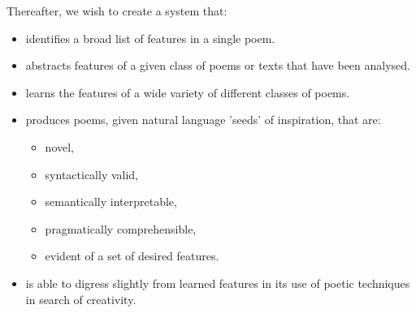 Thereafter, we wish to create a system that:
\begin{itemize}
\item{identifies a broad list of features in a single poem.} 
\item{abstracts features of a given class of poems or texts that have been analysed.}
\item{learns the features of a wide variety of different classes of poems.}
\item{produces poems, given natural language 'seeds' of inspiration, that are:}
	\begin{itemize}
	\setlength{\itemsep}{0pt}
	\item{novel,}
	\item{syntactically valid,}
	\item{semantically interpretable,}
	\item{pragmatically comprehensible,}
	\item{evident of a set of desired features.}
	\end{itemize} 
\item{is able to digress slightly from learned features in its use of poetic techniques in search of creativity.}
\end{itemize}


